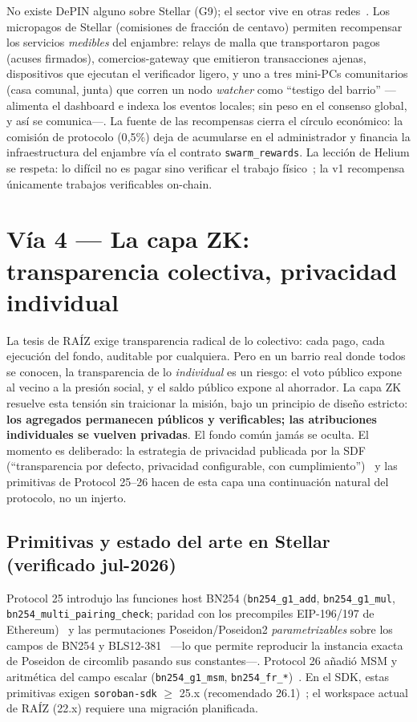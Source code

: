 \documentclass[twocolumn,10pt]{article}
\begin{document}
No existe DePIN alguno sobre Stellar (G9); el sector vive en otras redes~\cite{depin}. Los micropagos de Stellar (comisiones de fracci\'on de centavo) permiten recompensar los servicios \emph{medibles} del enjambre: relays de malla que transportaron pagos (acuses firmados), comercios-gateway que emitieron transacciones ajenas, dispositivos que ejecutan el verificador ligero, y uno a tres mini-PCs comunitarios (casa comunal, junta) que corren un nodo \emph{watcher} como ``testigo del barrio'' ---alimenta el dashboard e indexa los eventos locales; sin peso en el consenso global, y as\'i se comunica---. La fuente de las recompensas cierra el c\'irculo econ\'omico: la comisi\'on de protocolo (0{,}5\%) deja de acumularse en el administrador y financia la infraestructura del enjambre v\'ia el contrato \texttt{swarm\_rewards}. La lecci\'on de Helium se respeta: lo dif\'icil no es pagar sino verificar el trabajo f\'isico~\cite{helium}; la v1 recompensa \'unicamente trabajos verificables on-chain.

\section{V\'ia 4 --- La capa ZK: transparencia colectiva, privacidad individual}
\label{sec:zk}

La tesis de RA\'IZ exige transparencia radical de lo colectivo: cada pago, cada ejecuci\'on del fondo, auditable por cualquiera. Pero en un barrio real donde todos se conocen, la transparencia de lo \emph{individual} es un riesgo: el voto p\'ublico expone al vecino a la presi\'on social, y el saldo p\'ublico expone al ahorrador. La capa ZK resuelve esta tensi\'on sin traicionar la misi\'on, bajo un principio de dise\~no estricto: \textbf{los agregados permanecen p\'ublicos y verificables; las atribuciones individuales se vuelven privadas}. El fondo com\'un jam\'as se oculta. El momento es deliberado: la estrategia de privacidad publicada por la SDF (``transparencia por defecto, privacidad configurable, con cumplimiento'')~\cite{privstrat} y las primitivas de Protocol 25--26 hacen de esta capa una continuaci\'on natural del protocolo, no un injerto.

\subsection{Primitivas y estado del arte en Stellar (verificado jul-2026)}

Protocol 25 introdujo las funciones host BN254 (\texttt{bn254\_g1\_add}, \texttt{bn254\_g1\_mul}, \texttt{bn254\_multi\_pairing\_check}; paridad con los precompiles EIP-196/197 de Ethereum)~\cite{cap74} y las permutaciones Poseidon/Poseidon2 \emph{parametrizables} sobre los campos de BN254 y BLS12-381~\cite{cap75} ---lo que permite reproducir la instancia exacta de Poseidon de circomlib pasando sus constantes---. Protocol 26 a\~nadi\'o MSM y aritm\'etica del campo escalar (\texttt{bn254\_g1\_msm}, \texttt{bn254\_fr\_*})~\cite{cap80}. En el SDK, estas primitivas exigen \texttt{soroban-sdk} $\geq$ 25.x (recomendado 26.1)~\cite{sdkzk}; el workspace actual de RA\'IZ (22.x) requiere una migraci\'on planificada.
\end{document}

